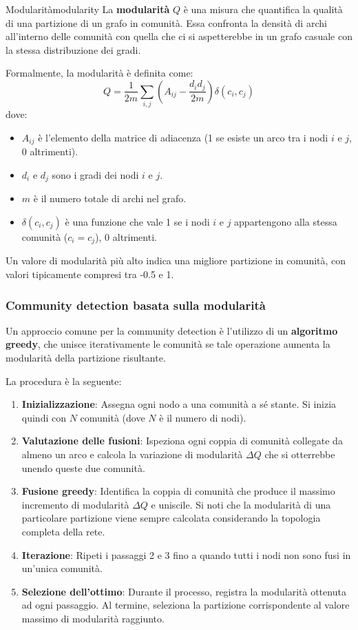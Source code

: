 \begin{definizione}{Modularità}{modularity}
    La \textbf{modularità} $Q$ è una misura che quantifica la qualità di una
    partizione di un grafo in comunità. Essa confronta la densità di archi
    all'interno delle comunità con quella che ci si aspetterebbe in un grafo
    casuale con la stessa distribuzione dei gradi.
    
    Formalmente, la modularità è definita come:
    \[
    Q = \frac{1}{2m} \sum_{i,j} \left( A_{ij} - \frac{d_i d_j}{2m} \right) \delta(c_i, c_j)
    \]
    dove:
    \begin{itemize}
        \item $A_{ij}$ è l'elemento della matrice di adiacenza (1 se esiste un
        arco tra i nodi $i$ e $j$, 0 altrimenti).
        \item $d_i$ e $d_j$ sono i gradi dei nodi $i$ e $j$.
        \item $m$ è il numero totale di archi nel grafo.
        \item $\delta(c_i, c_j)$ è una funzione che vale 1 se i nodi $i$ e $j$
        appartengono alla stessa comunità ($c_i = c_j$), 0 altrimenti.
    \end{itemize}
    
    Un valore di modularità più alto indica una migliore partizione in
    comunità, con valori tipicamente compresi tra -0.5 e 1.
\end{definizione}

\subsubsection{Community detection basata sulla modularità}
Un approccio comune per la community detection è l'utilizzo di un \textbf{algoritmo greedy}, che unisce iterativamente le comunità se tale operazione aumenta la modularità della partizione risultante.

La procedura è la seguente:
\begin{enumerate}
    \item \textbf{Inizializzazione}: Assegna ogni nodo a una comunità a sé stante. Si inizia quindi con $N$ comunità (dove $N$ è il numero di nodi).
    \item \textbf{Valutazione delle fusioni}: Ispeziona ogni coppia di comunità collegate da almeno un arco e calcola la variazione di modularità $\Delta Q$ che si otterrebbe unendo queste due comunità.
    \item \textbf{Fusione greedy}: Identifica la coppia di comunità che produce il massimo incremento di modularità $\Delta Q$ e uniscile. Si noti che la modularità di una particolare partizione viene sempre calcolata considerando la topologia completa della rete.
    \item \textbf{Iterazione}: Ripeti i passaggi 2 e 3 fino a quando tutti i nodi non sono fusi in un'unica comunità.
    \item \textbf{Selezione dell'ottimo}: Durante il processo, registra la modularità ottenuta ad ogni passaggio. Al termine, seleziona la partizione corrispondente al valore massimo di modularità raggiunto.
\end{enumerate}

